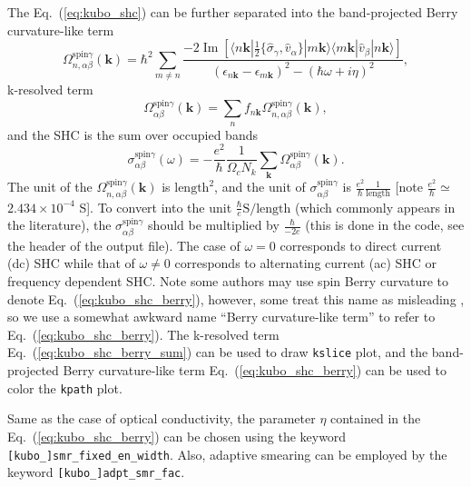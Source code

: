 The Eq.~(\ref{eq:kubo_shc}) can be further separated into 
the band-projected Berry curvature-like term
\begin{equation}
\label{eq:kubo_shc_berry}
\Omega_{n,\alpha\beta}^{\text{spin}\gamma}(\bm{k}) = {\hbar}^2 \sum_{
	m\ne n}\frac{-2\operatorname{Im}[\langle n\bm{k}| 
	\frac{1}{2}\{\hat{\sigma}_{\gamma},\hat{v}_{\alpha}\}|m\bm{k}\rangle
	\langle m\bm{k}| \hat{v}_{\beta}|n\bm{k}\rangle]}
{(\epsilon_{n\bm{k}}-\epsilon_{m\bm{k}})^2-(\hbar\omega+i\eta)^2},
\end{equation}
k-resolved term
\begin{equation}
\label{eq:kubo_shc_berry_sum}
\Omega_{\alpha\beta}^{\text{spin}\gamma}(\bm{k}) = \sum_{n}
f_{n\bm{k}} \Omega_{n,\alpha\beta}^{\text{spin}\gamma}(\bm{k}),
\end{equation}
and the SHC is the sum over occupied bands
\begin{equation}
\sigma_{\alpha\beta}^{\text{spin}\gamma}(\omega) = 
-\frac{e^2}{\hbar}\frac{1}{\Omega_c N_k}\sum_{\bm{k}}
\Omega_{\alpha\beta}^{\text{spin}\gamma}(\bm{k}).
\end{equation}
The unit of the $\Omega_{n,\alpha\beta}^{\text{spin}\gamma}(\bm{k})$ 
is $\text{length}^{2}$, and the unit of  $\sigma_{\alpha\beta}^{\text{spin}\gamma}$ 
is $\frac{e^2}{\hbar}\frac{1}{\text{length}}$ 
[note $\frac{e^2}{\hbar} \simeq$ $2.434\times10^{-4}$ S]. 
To convert into the unit $\frac{\hbar}{e} {\text{S/length}}$ 
(which commonly appears in the literature), 
the $\sigma_{\alpha\beta}^{\text{spin}\gamma}$ should be multiplied 
by $\frac{\hbar}{-2e}$ (this is done in the code, see the header of the output file). 
The case of $\omega=0$ corresponds to 
direct current (dc) SHC while that of $\omega\ne0$ 
corresponds to alternating current (ac) SHC or frequency dependent SHC. 
Note some authors may use spin Berry curvature to denote 
Eq.~(\ref{eq:kubo_shc_berry}), however, some treat this 
name as misleading \cite{Gradhand_2012}, so we use a somewhat awkward name 
``Berry curvature-like term'' to refer to Eq.~(\ref{eq:kubo_shc_berry}). 
The k-resolved term Eq.~(\ref{eq:kubo_shc_berry_sum}) can be 
used to draw {\tt kslice} plot, and the band-projected Berry curvature-like term 
Eq.~(\ref{eq:kubo_shc_berry})
can be used to color the {\tt kpath} plot. 

Same as the case of optical conductivity, the parameter
$\eta$ contained in the Eq.~(\ref{eq:kubo_shc_berry}) can be chosen using the keyword {\tt[kubo\_]smr\_fixed\_en\_width}. Also, adaptive smearing can 
be employed by the keyword {\tt [kubo\_]adpt\_smr\_fac}. 


